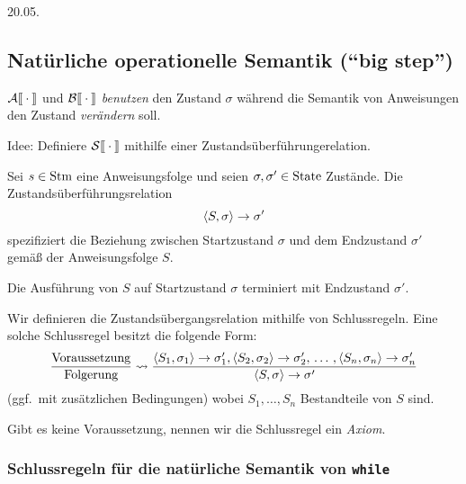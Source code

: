 \newpage
\hfill 20.05.
\subsection{Natürliche operationelle Semantik (``big step'')}

$\mathcal{A}\mathrm{[}\kern-.14em\mathrm{[}\cdot\mathrm{]}\kern-.14em\mathrm{]}$ und $\mathcal{B}\mathrm{[}\kern-.14em\mathrm{[}\cdot\mathrm{]}\kern-.14em\mathrm{]}$ \emph{benutzen} den Zustand $\sigma$ während die Semantik von Anweisungen den Zustand \emph{verändern} soll.

Idee: Definiere $\mathcal{S}\mathrm{[}\kern-.14em\mathrm{[}\cdot\mathrm{]}\kern-.14em\mathrm{]}$ mithilfe einer Zustandsüberführungerelation.

\begin{definition}
    Sei $s \in \operatorname{Stm}$ eine Anweisungsfolge und seien $\sigma, \sigma' \in \operatorname{State}$ Zustände. Die Zustandsüberführungsrelation
    \[
    \langle S, \sigma \rangle \to \sigma'
    \]
    spezifiziert die Beziehung zwischen Startzustand $\sigma$ und dem Endzustand $\sigma'$ gemäß der Anweisungsfolge $S$.
\end{definition}

\begin{remark}[Bedeutung]
    Die Ausführung von $S$ auf Startzustand $\sigma$ terminiert mit Endzustand $\sigma'$.
\end{remark}

\par\medskip
\begin{notation}
    Wir definieren die Zustandsübergangsrelation mithilfe von Schlussregeln. Eine solche Schlussregel besitzt die folgende Form:
    \[
    \frac{\text{Voraussetzung}}{\text{Folgerung}} \leadsto \frac{\langle S_1, \sigma_1 \rangle \to \sigma_1', \langle S_2, \sigma_2 \rangle \to \sigma_2', \,\dots\, , \langle S_n, \sigma_n \rangle \to \sigma_n'}{\langle S, \sigma \rangle \to \sigma'}
    \]
    (ggf.\ mit zusätzlichen Bedingungen) wobei $S_1, \dots, S_n$ Bestandteile von $S$ sind.

    Gibt es keine Voraussetzung, nennen wir die Schlussregel ein \emph{Axiom}.
\end{notation}



\subsubsection{Schlussregeln für die natürliche Semantik von \texttt{while}}

